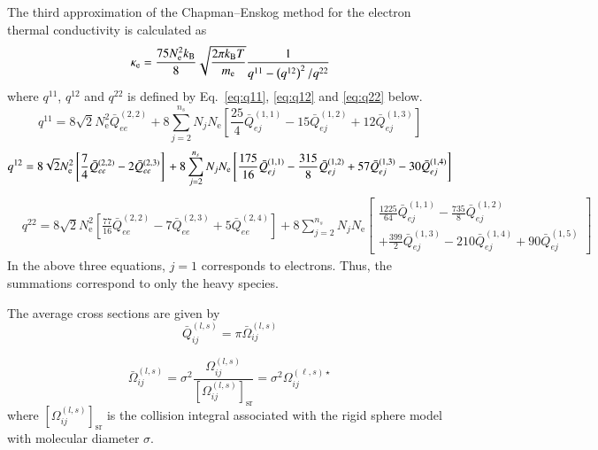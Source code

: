 \documentclass{warpdoc}
\begin{document}
The third approximation of the Chapman–Enskog method for the electron thermal conductivity is calculated \cite{pof:1967:devoto,tepjd:2000:capitelli} as
\begin{equation}
  \kappa_{\mathrm{e}}=\frac{75 N_{\mathrm{e}}^{2} k_{\rm B}}{8}\sqrt{\frac{2 \pi k_{\rm B} T}{{m}_{\mathrm{e}}}} \frac{1}{q^{11}-\left(q^{12}\right)^{2} / q^{22}}
\end{equation}
where $q^{11}$, $q^{12}$ and $q^{22}$ is defined by Eq.\ \ref{eq:q11}, \ref{eq:q12} and \ref{eq:q22} below.
\begin{equation}\label{eq:q11}
  q^{11}=8 \sqrt{2} N_{\mathrm{e}}^{2} \bar{Q}_{e e}^{(2,2)} + 8 \sum_{j=2}^{n_s} N_{j} N_{\mathrm{e}}\left[\frac{25}{4} \bar{Q}_{e j}^{(1,1)}-15 \bar{Q}_{e j}^{(1,2)}+12 \bar{Q}_{e j}^{(1,3)}\right]
\end{equation}
\begin{equation}\label{eq:q12}
  q^{12}=8 \sqrt{2} N_{\mathrm{e}}^{2}\left[\frac{7}{4} \bar{Q}_{e e}^{(2,2)}-2 \bar{Q}_{e e}^{(2,3)}\right] \\
  +8 \sum_{j=2}^{n_s} N_{j} N_{\mathrm{e}}\left[\frac{175}{16} \bar{Q}_{e j}^{(1,1)}-\frac{315}{8} \bar{Q}_{e j}^{(1,2)}+57 \bar{Q}_{e j}^{(1,3)}-30 \bar{Q}_{e j}^{(1,4)}\right]
\end{equation}
\begin{equation}\label{eq:q22}
\begin{aligned}
  &q^{22}=8 \sqrt{2} N_{\mathrm{e}}^{2}\left[\frac{77}{16} \bar{Q}_{e e}^{(2,2)}-7 \bar{Q}_{e e}^{(2,3)}+5 \bar{Q}_{e e}^{(2,4)}\right] +8 \sum_{j=2}^{n_s} N_{j} N_{\mathrm{e}}\left[\begin{array}{l}
  \frac{1225}{64} \bar{Q}_{e j}^{(1,1)}-\frac{735}{8} \bar{Q}_{e j}^{(1,2)} \\
  +\frac{399}{2} \bar{Q}_{e j}^{(1,3)}-210 \bar{Q}_{e j}^{(1,4)}+90 \bar{Q}_{e j}^{(1,5)}
\end{array}\right]
\end{aligned}
\end{equation}
In the above three equations, $j=1$ corresponds to electrons. Thus, the summations correspond to only the heavy species.

The average cross sections are given by
\begin{equation}
  \bar{Q}_{i j}^{(l, s)}=\pi \bar{\Omega}_{i j}^{(l, s)}
\end{equation}

\begin{equation}
  \bar{\Omega}_{i j}^{(l, s)}=\sigma^{2} \frac{\Omega_{i j}^{(l, s)}}{\left[\Omega_{i j}^{(l, s)}\right]_{\mathrm{sr}}} = \sigma^{2} \Omega^{(\ell, s) \star}_{ij}
\end{equation}
where $\left[\Omega_{i j}^{(l, s)}\right]_{\mathrm{sr}}$ is the collision integral associated with the rigid sphere model with molecular diameter $\sigma$.
\end{document}
